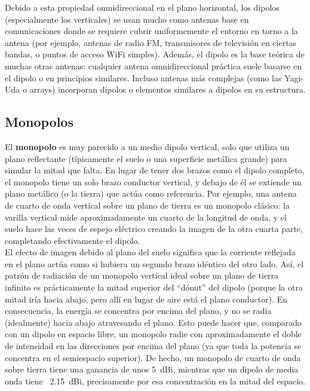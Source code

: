 Debido a esta propiedad omnidireccional en el plano horizontal, los dipolos (especialmente los verticales) se usan mucho como antenas base en comunicaciones donde se requiere cubrir uniformemente el entorno en torno a la antena (por ejemplo, antenas de radio FM, transmisores de televisión en ciertas bandas, o puntos de acceso WiFi simples). Además, el dipolo es la base teórica de muchas otras antenas: cualquier antena omnidireccional práctica suele basarse en el dipolo o en principios similares. Incluso antenas más complejas (como las Yagi-Uda o arrays) incorporan dipolos o elementos similares a dipolos en su estructura.

\subsection{Monopolos}


El \textbf{monopolo} es muy parecido a un medio dipolo vertical, solo que utiliza un plano reflectante (típicamente el suelo o una superficie metálica grande) para simular la mitad que falta. En lugar de tener dos brazos como el dipolo completo, el monopolo tiene un solo brazo conductor vertical, y debajo de él se extiende un plano metálico (o la tierra) que actúa como referencia. Por ejemplo, una antena de cuarto de onda vertical sobre un plano de tierra es un monopolo clásico: la varilla vertical mide aproximadamente un cuarto de la longitud de onda, y el suelo hace las veces de espejo eléctrico creando la imagen de la otra cuarta parte, completando efectivamente el dipolo.\\

El efecto de imagen debido al plano del suelo significa que la corriente reflejada en el plano actúa como si hubiera un segundo brazo idéntico del otro lado. Así, el patrón de radiación de un monopolo vertical ideal sobre un plano de tierra infinito es prácticamente la mitad superior del “dónut” del dipolo (porque la otra mitad iría hacia abajo, pero allí en lugar de aire está el plano conductor). En consecuencia, la energía se concentra por encima del plano, y no se radia (idealmente) hacia abajo atravesando el plano. Esto puede hacer que, comparado con un dipolo en espacio libre, un monopolo radie con aproximadamente el doble de intensidad en las direcciones por encima del plano (ya que toda la potencia se concentra en el semiespacio superior). De hecho, un monopolo de cuarto de onda sobre tierra tiene una ganancia de unos 5~dBi, mientras que un dipolo de media onda tiene ~2.15~dBi, precisamente por esa concentración en la mitad del espacio.\\

